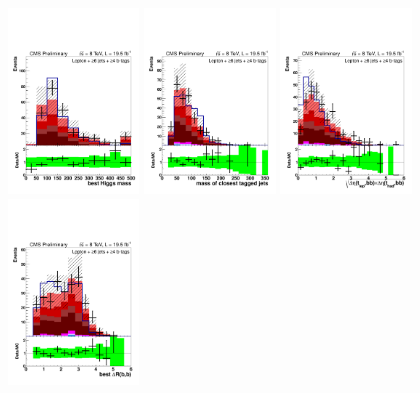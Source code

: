 \begin{figure}[hbtp]
\begin{center}
   \includegraphics[width=0.31\textwidth]{Figures/Analysis_2_Diagrams/LJ_plots_lep/6j4t/lep_best_higgs_mass_6j4t_cumulative_wRatio_noLegend_lin.pdf}
   \includegraphics[width=0.31\textwidth]{Figures/Analysis_2_Diagrams/LJ_plots_lep/6j4t/lep_closest_tagged_dijet_mass_6j4t_cumulative_wRatio_noLegend_lin.pdf}
   \includegraphics[width=0.31\textwidth]{Figures/Analysis_2_Diagrams/LJ_plots_lep/6j4t/lep_dEta_fn_6j4t_cumulative_wRatio_noLegend_lin.pdf}
   \includegraphics[width=0.31\textwidth]{Figures/Analysis_2_Diagrams/LJ_plots_lep/6j4t/lep_dRbb_6j4t_cumulative_wRatio_noLegend_lin.pdf}

\end{center}
\end{figure}

